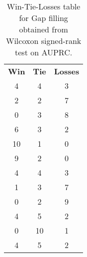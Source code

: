 \begin{table}
\centering
\caption{Win-Tie-Losses table for Gap filling obtained from Wilcoxon signed-rank test on AUPRC.}
\label{tab:gap_filling_model_comparison_AUPRC}
\begin{tabular}{|c|c|c|}
\toprule
 \textbf{Win} &  \textbf{Tie} &  \textbf{Losses} \\
            4 &             4 &                3 \\
\midrule
            2 &             2 &                7 \\
            0 &             3 &                8 \\
            6 &             3 &                2 \\
           10 &             1 &                0 \\
            9 &             2 &                0 \\
            4 &             4 &                3 \\
            1 &             3 &                7 \\
            0 &             2 &                9 \\
            4 &             5 &                2 \\
            0 &            10 &                1 \\
            4 &             5 &                2 \\
\bottomrule
\end{tabular}
\end{table}
